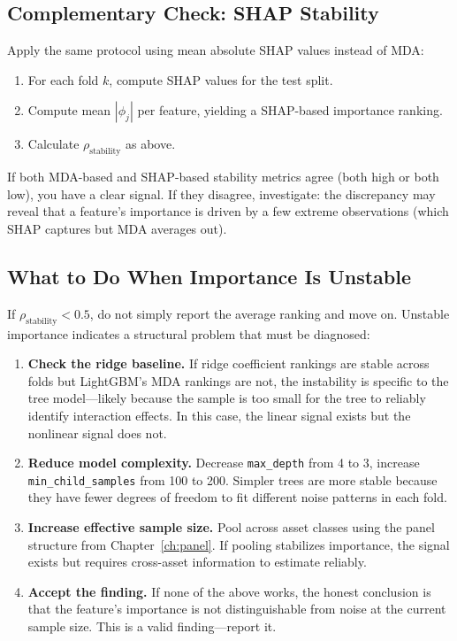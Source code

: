 \subsection{Complementary Check: SHAP Stability}

Apply the same protocol using mean absolute SHAP values instead of MDA:
\begin{enumerate}[nosep]
  \item For each fold $k$, compute SHAP values for the test split.
  \item Compute mean $|\phi_j|$ per feature, yielding a SHAP-based importance ranking.
  \item Calculate $\rho_{\mathrm{stability}}$ as above.
\end{enumerate}

If both MDA-based and SHAP-based stability metrics agree (both high or both low), you have a clear signal.
If they disagree, investigate: the discrepancy may reveal that a feature's importance is driven by a few extreme observations (which SHAP captures but MDA averages out).

\subsection{What to Do When Importance Is Unstable}

If $\rho_{\mathrm{stability}} < 0.5$, do not simply report the average ranking and move on.
Unstable importance indicates a structural problem that must be diagnosed:

\begin{enumerate}[nosep]
  \item \textbf{Check the ridge baseline.}
  If ridge coefficient rankings are stable across folds but LightGBM's MDA rankings are not, the instability is specific to the tree model---likely because the sample is too small for the tree to reliably identify interaction effects.
  In this case, the linear signal exists but the nonlinear signal does not.

  \item \textbf{Reduce model complexity.}
  Decrease \texttt{max\_depth} from 4 to 3, increase \texttt{min\_child\_samples} from 100 to 200.
  Simpler trees are more stable because they have fewer degrees of freedom to fit different noise patterns in each fold.

  \item \textbf{Increase effective sample size.}
  Pool across asset classes using the panel structure from Chapter~\ref{ch:panel}.
  If pooling stabilizes importance, the signal exists but requires cross-asset information to estimate reliably.

  \item \textbf{Accept the finding.}
  If none of the above works, the honest conclusion is that the feature's importance is not distinguishable from noise at the current sample size.
  This is a valid finding---report it.
\end{enumerate}

